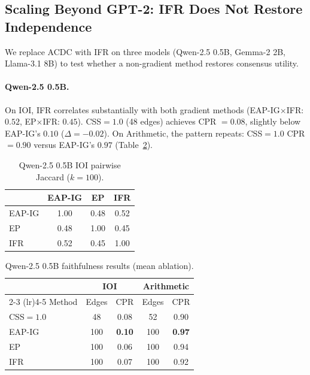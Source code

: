 \documentclass[11pt]{article}
\begin{document}
\subsection{Scaling Beyond GPT-2: IFR Does Not Restore Independence}
\label{sec:scaling}

We replace ACDC with IFR on three models (Qwen-2.5 0.5B, Gemma-2 2B, Llama-3.1 8B) to test whether a non-gradient method restores consensus utility.

\paragraph{Qwen-2.5 0.5B.} On IOI, IFR correlates substantially with both gradient methods (EAP-IG$\times$IFR: $0.52$, EP$\times$IFR: $0.45$). CSS$=1.0$ (48 edges) achieves CPR $= 0.08$, slightly below EAP-IG's $0.10$ ($\Delta = -0.02$). On Arithmetic, the pattern repeats: CSS$=1.0$ CPR $= 0.90$ versus EAP-IG's $0.97$ (Table~\ref{tab:qwen}).

\begin{table}[h]
\centering
\caption{Qwen-2.5 0.5B IOI pairwise Jaccard ($k=100$).}
\label{tab:qwen_jaccard}
\begin{tabular}{lccc}
\toprule
 & EAP-IG & EP & IFR \\
\midrule
EAP-IG & 1.00 & 0.48 & 0.52 \\
EP & 0.48 & 1.00 & 0.45 \\
IFR & 0.52 & 0.45 & 1.00 \\
\bottomrule
\end{tabular}
\end{table}

\begin{table}[h]
\centering
\caption{Qwen-2.5 0.5B faithfulness results (mean ablation).}
\label{tab:qwen}
\begin{tabular}{lcccc}
\toprule
 & \multicolumn{2}{c}{IOI} & \multicolumn{2}{c}{Arithmetic} \\
\cmidrule(lr){2-3} \cmidrule(lr){4-5}
Method & Edges & CPR & Edges & CPR \\
\midrule
CSS$=1.0$ & 48 & 0.08 & 52 & 0.90 \\
EAP-IG & 100 & \textbf{0.10} & 100 & \textbf{0.97} \\
EP & 100 & 0.06 & 100 & 0.94 \\
IFR & 100 & 0.07 & 100 & 0.92 \\
\bottomrule
\end{tabular}
\end{table}
\end{document}

